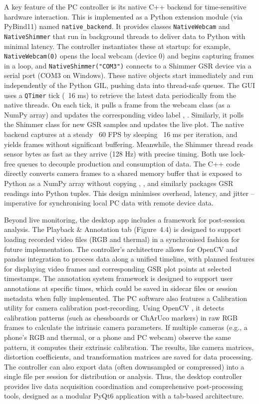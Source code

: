 A key feature of the PC controller is its native C++ backend for time-sensitive hardware interaction. This is implemented as a Python extension module (via PyBind11) \cite{ref18} named \texttt{native\_backend}. It provides classes \texttt{NativeWebcam} and \texttt{NativeShimmer} that run in background threads to deliver data to Python with minimal latency. The controller instantiates these at startup: for example, \texttt{NativeWebcam(0)} opens the local webcam (device 0) and begins capturing frames in a loop, and \texttt{NativeShimmer("COM3")} connects to a Shimmer GSR device via a serial port (COM3 on Windows). These native objects start immediately and run independently of the Python GIL, pushing data into thread-safe queues. The GUI uses a \texttt{QTimer} tick (~16 ms) to retrieve the latest data periodically from the native threads. On each tick, it pulls a frame from the webcam class (as a NumPy array) and updates the corresponding video label \cite{ref1}, \cite{ref2}. Similarly, it polls the Shimmer class for new GSR samples and updates the live plot. The native backend captures at a steady ~60 FPS by sleeping ~16 ms per iteration, and yields frames without significant buffering. Meanwhile, the Shimmer thread reads sensor bytes as fast as they arrive (128 Hz) with precise timing. Both use lock-free queues to decouple production and consumption of data. The C++ code directly converts camera frames to a shared memory buffer that is exposed to Python as a NumPy array without copying \cite{ref1}, \cite{ref2}, and similarly packages GSR readings into Python tuples. This design minimises overhead, latency, and jitter -- imperative for synchronising local PC data with remote device data.

Beyond live monitoring, the desktop app includes a framework for post-session analysis. The Playback \& Annotation tab (Figure~4.4) is designed to support loading recorded video files (RGB and thermal) in a synchronised fashion for future implementation. The controller's architecture allows for OpenCV and pandas integration to process data along a unified timeline, with planned features for displaying video frames and corresponding GSR plot points at selected timestamps. The annotation system framework is designed to support user annotations at specific times, which could be saved in sidecar files or session metadata when fully implemented. The PC software also features a Calibration utility for camera calibration post-recording. Using OpenCV \cite{ref22}, it detects calibration patterns (such as chessboards or ChArUco markers) in raw RGB frames to calculate the intrinsic camera parameters. If multiple cameras (e.g., a phone’s RGB and thermal, or a phone and PC webcam) observe the same pattern, it computes their extrinsic calibration. The results, like camera matrices, distortion coefficients, and transformation matrices are saved for data processing. The controller can also export data (often downsampled or compressed) into a single file per session for distribution or analysis. Thus, the desktop controller provides live data acquisition coordination and comprehensive post-processing tools, designed as a modular PyQt6 application with a tab-based architecture.

